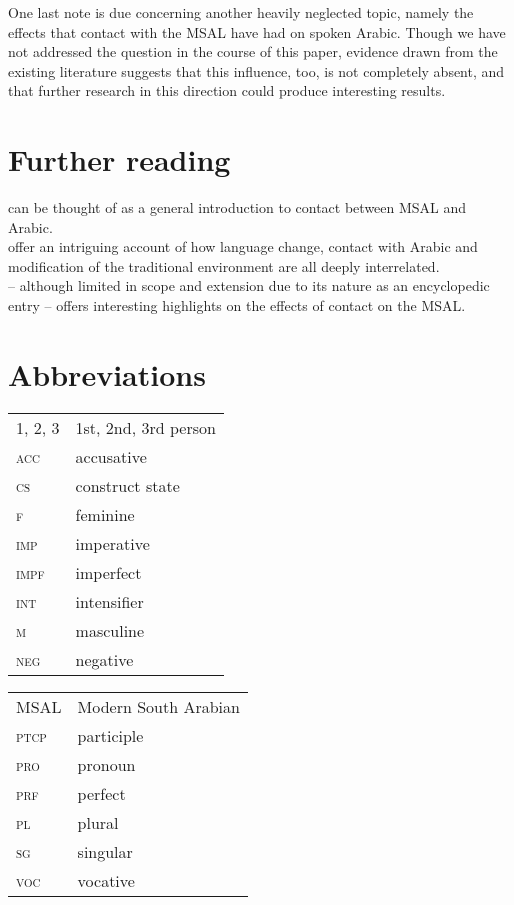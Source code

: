 \documentclass[output=paper]{langsci/langscibook}
\begin{document}
One last note is due concerning another heavily neglected topic, namely the effects that contact with the MSAL have had on spoken Arabic. Though we have not addressed the question in the course of this paper, evidence drawn from the existing literature \citet{Simeone-Senelle2002} suggests that this influence, too, is not completely absent, and that further research in this direction could produce interesting results. 

\section*{Further reading}

 \citet{Morris2017} can be thought of as a general introduction to contact between MSAL and Arabic. \\
 \citet{WatsonAl-Mahri2017} offer an intriguing account of how language change, contact with Arabic and modification of the traditional environment are all deeply interrelated. \\ \citet{Lonnet2011} – although limited in scope and extension due to its nature as an encyclopedic entry – offers interesting highlights on the effects of contact on the MSAL. \\
 
 
\section*{Abbreviations}

\begin{tabularx}{.45\textwidth}{lQ}
\textsc{1, 2, 3} & 1st, 2nd, 3rd person \\
\textsc{acc} & accusative \\
\textsc{cs} & construct state \\
\textsc{f} & feminine \\
\textsc{imp} & imperative \\
\textsc{impf} & imperfect \\
\textsc{int} & intensifier \\
\textsc{m} & masculine \\
\textsc{neg} & negative \\
\end{tabularx}
\begin{tabularx}{.45\textwidth}{lQ}
MSAL & Modern South Arabian \\
\textsc{ptcp} & participle \\
\textsc{pro} & pronoun \\
\textsc{prf} & perfect \\
\textsc{pl} & plural \\
\textsc{sg} & singular \\
\textsc{voc} & vocative \\
\end{tabularx}





\sloppy
\printbibliography[heading=subbibliography,notkeyword=this]
\end{document}
